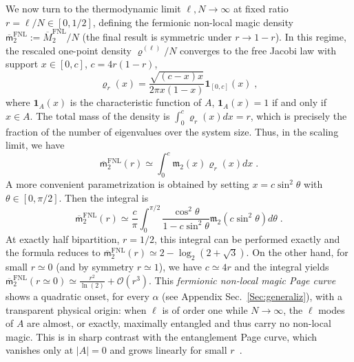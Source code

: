 \documentclass[prx,twocolumn,superscriptaddress,aps,10pt, frontmatterverbose, reprint,footinbib,longbibliography=true]{revtex4-2}
\newcommand{\RENYI}{\alpha}
\providecommand{\DIFaddtex}[1]{{\protect\color{red}#1}} %
\providecommand{\DIFdeltex}[1]{} %
\providecommand{\DIFaddbegin}{\protect\color{red}} %
\providecommand{\DIFaddend}{\protect\color{black}} %
\providecommand{\DIFdelbegin}{} %
\providecommand{\DIFdelend}{} %
\providecommand{\DIFadd}[1]{\texorpdfstring{\DIFaddtex{#1}}{#1}} %
\providecommand{\DIFdel}[1]{\texorpdfstring{\DIFdeltex{#1}}{}} %
\begin{document}
We now turn to the thermodynamic limit $\ell,N\to\infty$ at fixed ratio $r=\ell/N\in[0,1/2]$, defining the fermionic non-local magic density $\overline{\mathsf{m}}_2^\mathrm{FNL}:=\overline{M}_2^\mathrm{FNL}/N$ (the final result is symmetric under $r\to 1-r$).
In this regime, the rescaled  one-point density $\varrho^{(\ell)}/N$ converges to the free Jacobi law with support $x\in [0,c]$, $c=4r(1-r)$,
\begin{equation}
    \varrho_r(x) = \frac{\sqrt{(c-x)x}}{2\pi x(1-x)}\mathbf{1}_{[0,c]}(x)\;,
\end{equation}
where $\mathbf{1}_A(x)$ is the characteristic function of $A$, $\mathbf{1}_A(x)=1$ if and only if $x\in A$. 
The total mass of the density is $\int_0^c \varrho_r(x) dx=r$, which is precisely the fraction of the number of eigenvalues over the system size. 
Thus, in the scaling limit, we have
\begin{equation}
\overline{\mathsf{m}}_2^\mathrm{FNL}(r)\simeq \int_0^c \mathfrak{m}_2(x) \varrho_r(x)dx\;.
\end{equation}
A more convenient parametrization is obtained by setting $x=c\sin^2\theta$  with $\theta\in[0,\pi/2]$. Then the integral is 
\begin{equation}
\overline{\mathsf{m}}_2^\mathrm{FNL}(r)\simeq \frac{c}{\pi}\int_0^{\pi/2} \frac{\cos^2 \theta}{1-c\sin^2\theta} \mathfrak{m}_2(c\sin^2 \theta)d\theta\;.\label{eq:ziopin2}
\end{equation}
At exactly half bipartition, $r=1/2$, this integral can be performed exactly and the formula reduces to 
$\overline{\mathsf{m}}_2^\mathrm{FNL}(r)\simeq 2-\log_2(2+\sqrt{3})$.
On the other hand, for small $r\simeq 0$ (and by symmetry $r\simeq 1$), we have $c\simeq 4r$ and the integral yields $\overline{\mathsf{m}}_2^\mathrm{FNL}(r\simeq 0)\simeq \frac{r^2}{\ln(2)}+\mathcal{O}(r^3)$. 
This {\em fermionic non-local magic Page curve} shows a  quadratic onset,  for every \DIFdelbegin \DIFdel{$\alpha$ }\DIFdelend \DIFaddbegin \DIFadd{$\RENYI$ }\DIFaddend (see Appendix Sec.~\ref{Sec:generaliz}), with a transparent physical origin: when $\ell$ is of order one while $N\to\infty$, the $\ell$ modes of $A$ are almost, or exactly, maximally entangled and thus carry no non-local magic. 
This is in sharp contrast with the entanglement Page curve, which vanishes only at $|A|=0$ and grows linearly for small $r$~\cite{PhysRevE.106.034118,PhysRevLett.125.180604,PhysRevB.103.L241118}.
\end{document}
